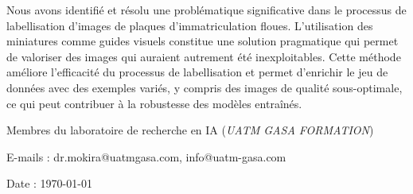 \documentclass[twocolumn]{el-author}
\begin{document}
Nous avons identifié et résolu une problématique significative dans le processus de labellisation d'images de plaques d'immatriculation floues. L'utilisation des miniatures comme guides visuels constitue une solution pragmatique qui permet de valoriser des images qui auraient autrement été inexploitables. Cette méthode améliore l'efficacité du processus de labellisation et permet d'enrichir le jeu de données avec des exemples variés, y compris des images de qualité sous-optimale, ce qui peut contribuer à la robustesse des modèles entraînés.


\vskip5pt

\noindent Membres du laboratoire de recherche en IA (\textit{UATM GASA FORMATION})
\vskip3pt

\noindent E-mails : dr.mokira@uatmgasa.com, info@uatm-gasa.com
\vskip5pt

\noindent Date : \today
\end{document}

